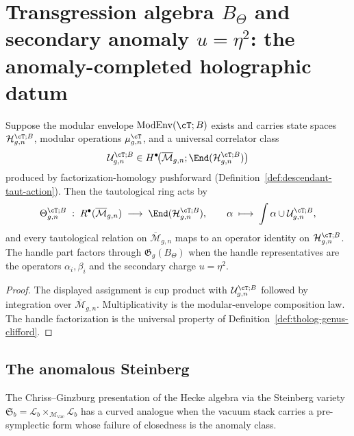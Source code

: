 
\section{Transgression algebra $B_\Theta$ and secondary anomaly $u=\eta^2$:
the anomaly-completed holographic datum}
\label{app:anomaly-completed-extensions-comparisons}

\providecommand{\ModEnv}{\operatorname{ModEnv}}
\providecommand{\Mbar}{\overline{\mathcal M}}
\providecommand{\Rring}{R^{\bullet}}

\begin{theorem}
\label{thm:tholog-tautological-transgression-action}
Suppose the modular envelope \(\ModEnv(\cT;B)\) exists and carries
state spaces \(\mathcal{H}_{g,n}^{\cT;B}\), modular operations
\(\mu_{g,n}^{\cT}\), and a universal correlator class
\[
\mathcal{U}_{g,n}^{\cT;B}
\in
H^{\bullet}\!\bigl(\Mbar_{g,n};
\End(\mathcal{H}_{g,n}^{\cT;B})\bigr)
\]
produced by factorization-homology pushforward
(Definition~\ref{def:descendant-taut-action}).  Then the
tautological ring acts by
\[
\Theta_{g,n}^{\cT;B}
\;:\;
\Rring(\Mbar_{g,n})
\;\longrightarrow\;
\End(\mathcal{H}_{g,n}^{\cT;B}),
\qquad
\alpha\;\longmapsto\;
\int\alpha\cup\mathcal{U}_{g,n}^{\cT;B},
\]
and every tautological relation on \(\Mbar_{g,n}\) maps to an operator
identity on \(\mathcal{H}_{g,n}^{\cT;B}\).  The handle part factors
through \(\mathfrak{G}_{g}(B_{\Theta})\) when the handle
representatives are the operators \(\alpha_i,\beta_i\) and the
secondary charge \(u=\eta^2\).
\end{theorem}

\begin{proof}
The displayed assignment is cup product with
\(\mathcal U_{g,n}^{\cT;B}\) followed by integration over
\(\Mbar_{g,n}\).  Multiplicativity is the modular-envelope
composition law.  The handle factorization is the universal property
of Definition~\ref{def:tholog-genus-clifford}.
\end{proof}

\subsection{The anomalous Steinberg}
\label{subsec:anomalous-steinberg}

\providecommand{\Mvac}{\mathcal{M}_{\mathrm{vac}}}
\providecommand{\Lb}{\mathcal{L}_b}
\providecommand{\Sb}{\mathfrak{S}_b}

The Chriss--Ginzburg presentation of the Hecke algebra via the
Steinberg variety $\Sb = \Lb \times_{\Mvac} \Lb$ has a curved
analogue when the vacuum stack carries a pre-symplectic form whose
failure of closedness is the anomaly class.

